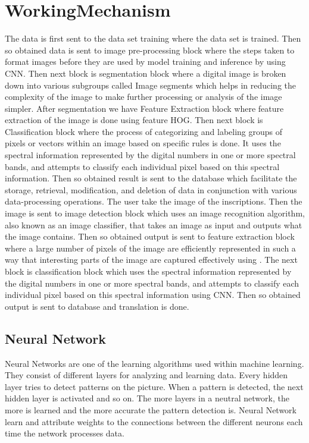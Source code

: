\section{WorkingMechanism}
\begin{figure}[tbh] %
\begin{center}
	\label{figObjectDetectionusingYOLO} %
\end{center}
\end{figure}
The data is first sent to the data set training where the data set is trained. Then so obtained data is sent to image pre-processing block where the steps taken to format images before they are used by model training and inference by using CNN. Then next block is segmentation block where a digital image is broken down into various subgroups called Image segments which helps in reducing the complexity of the image to make further processing or analysis of the image simpler. After segmentation we have Feature Extraction block where feature extraction of the image is done using feature HOG. Then next block is Classification block where the process of categorizing and labeling groups of pixels or vectors within an image based on specific rules is done. It uses the spectral information represented by the digital numbers in one or more spectral bands, and attempts to classify each individual pixel based on this spectral information. Then so obtained result is sent to the database which facilitate the storage, retrieval, modification, and deletion of data in conjunction with various data-processing operations.
The user  take the image of the inscriptions. Then the image is sent to image detection block which uses an image recognition algorithm, also known as an image classifier, that takes an image as input and outputs what the image contains. Then so obtained output is sent to feature extraction block where  a large number of pixels of the image are efficiently represented in such a way that interesting parts of the image are captured effectively using . The next block is classification block which uses the spectral information represented by the digital numbers in one or more spectral bands, and attempts to classify each individual pixel based on this spectral information using CNN. Then so obtained output is sent to database and translation is done.

\subsection{Neural Network}
Neural Networks are one of the learning algorithms used within machine learning. They consist of different layers for analyzing and learning data. Every hidden layer tries to detect patterns on the picture. When a pattern is detected, the next hidden layer is activated and so on. The more layers in a neutral network, the more is learned and the more accurate the pattern detection is.  Neural Network learn and attribute weights to the connections between the different neurons each time the network processes data.

